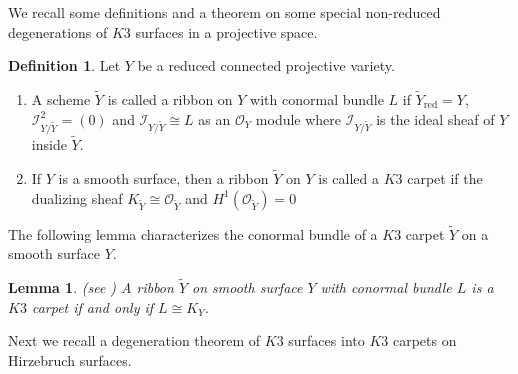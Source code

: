 \documentclass[11pt,twoside]{amsart}
\theoremstyle{plain}
\numberwithin{equation}{section}
\newtheorem{lemma}[theorem]{Lemma}
\theoremstyle{definition}
\newtheorem{definition}[theorem]{Definition}
\begin{document}
We recall some definitions and a theorem on some special non-reduced degenerations of $K3$ surfaces in a projective space.

\begin{definition}\label{ribbon}
Let $Y$ be a reduced connected projective variety.
 \begin{enumerate}
     \item A scheme $\widetilde{Y}$ is called a ribbon on $Y$ with conormal bundle $L$ if $\widetilde{Y}_{\operatorname{red}} = Y$, $\mathcal{I}_{Y/\widetilde{Y}}^2 = (0)$ and $\mathcal{I}_{Y/\widetilde{Y}} \cong L$ as an $\mathcal{O}_Y$ module where $\mathcal{I}_{Y/\widetilde{Y}}$ is the ideal sheaf of $Y$ inside $\widetilde{Y}$. 

     \item If $Y$ is a smooth surface, then a ribbon $\widetilde{Y}$ on $Y$ is called a $K3$ carpet if the dualizing sheaf $K_{\widetilde{Y}} \cong \mathcal{O}_{\widetilde{Y}}$ and $H^1(\mathcal{O}_{\widetilde{Y}})= 0$

\end{enumerate}
\end{definition}  

The following lemma characterizes the conormal bundle of a $K3$ carpet $\widetilde{Y}$ on a smooth surface $Y$.

\begin{lemma}(see \cite[Proposition $2.1$]{GGP08})
    A ribbon $\widetilde{Y}$ on smooth surface $Y$ with conormal bundle $L$ is a $K3$ carpet if and only if $L \cong K_Y$.
\end{lemma}

Next we recall a degeneration theorem of $K3$ surfaces into $K3$ carpets on Hirzebruch surfaces.
\end{document}
